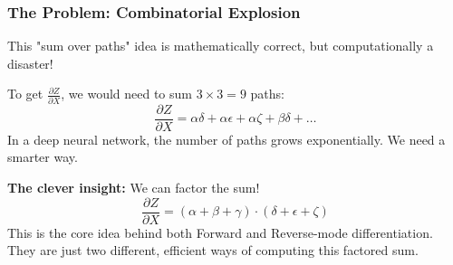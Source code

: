 \documentclass[xcolor=svgnames, 10pt, handout]{beamer}
\begin{document}
\begin{frame}
\frametitle{The Problem: Combinatorial Explosion}

This "sum over paths" idea is mathematically correct, but computationally a disaster!
\begin{center}
\end{center}
To get $\frac{\partial Z}{\partial X}$, we would need to sum $3 \times 3 = 9$ paths:
\begin{equation*}
    \frac{\partial Z}{\partial X} = \alpha\delta + \alpha\epsilon + \alpha\zeta + \beta\delta + \dots
\end{equation*}
In a deep neural network, the number of paths grows exponentially. We need a smarter way.

\textbf{The clever insight:} We can factor the sum!
\begin{equation*}
    \frac{\partial Z}{\partial X} = (\alpha + \beta + \gamma) \cdot (\delta + \epsilon + \zeta)
\end{equation*}
This is the core idea behind both Forward and Reverse-mode differentiation. They are just two different, efficient ways of computing this factored sum.

\end{frame}
\end{document}

